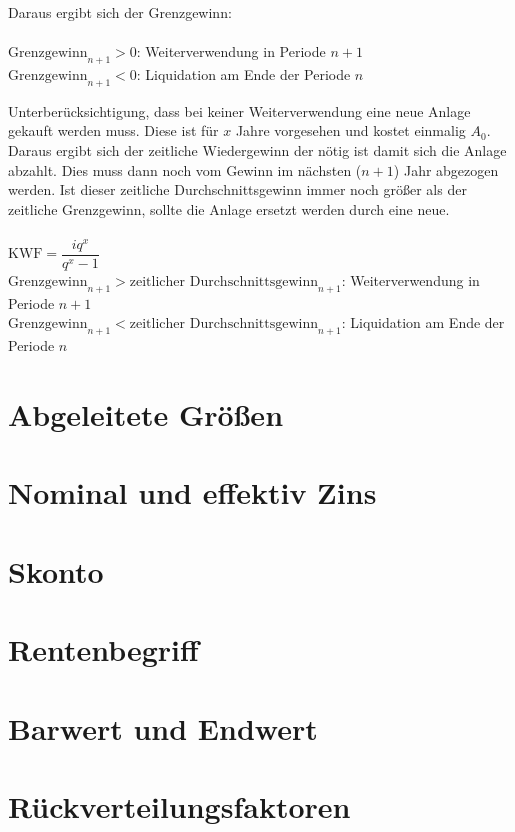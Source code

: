 Daraus ergibt sich der Grenzgewinn:\\
\\
$\text{Grenzgewinn}_{n+1} > 0$: Weiterverwendung in Periode $n+1$\\
$\text{Grenzgewinn}_{n+1} < 0$: Liquidation am Ende der Periode $n$

Unterberücksichtigung, dass bei keiner Weiterverwendung eine neue Anlage gekauft werden muss. Diese ist für $x$ Jahre vorgesehen und kostet einmalig $A_0$. Daraus ergibt sich der zeitliche Wiedergewinn der nötig ist damit sich die Anlage abzahlt.
Dies muss dann noch vom Gewinn im nächsten ($n+1$) Jahr abgezogen werden. Ist dieser zeitliche Durchschnittsgewinn immer noch größer als der zeitliche Grenzgewinn, sollte die Anlage ersetzt werden durch eine neue.\\
\\
$\text{KWF} = \dfrac{iq^x}{q^x-1}$\\
$\text{Grenzgewinn}_{n+1} > \text{zeitlicher Durchschnittsgewinn}_{n+1}$: Weiterverwendung in Periode $n+1$\\
$\text{Grenzgewinn}_{n+1} < \text{zeitlicher Durchschnittsgewinn}_{n+1}$: Liquidation am Ende der Periode $n$

\section{Abgeleitete Größen}
\section{Nominal und effektiv Zins}
\section{Skonto}
\section{Rentenbegriff}
\section{Barwert und Endwert}
\section{Rückverteilungsfaktoren}